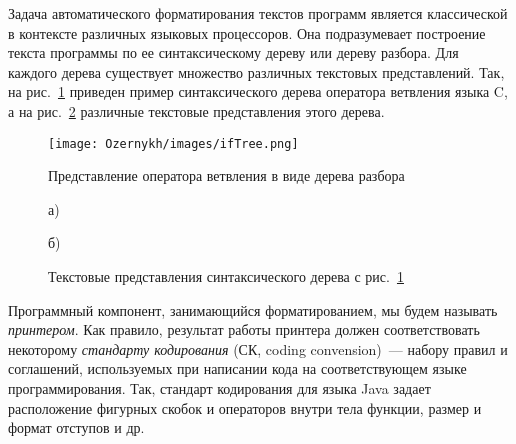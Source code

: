 Задача автоматического форматирования текстов программ является классической в контексте различных языковых процессоров.
Она подразумевает построение текста программы по ее синтаксическому дереву или дереву разбора.
Для каждого дерева существует множество различных текстовых представлений.
Так, на рис.~\ref{fig:ifTree} приведен пример синтаксического дерева оператора ветвления языка C, а на рис.~\ref{intro:treeToCode} различные текстовые представления этого дерева.
\begin{figure}[h]
	\centering
	\texttt{[image: Ozernykh/images/ifTree.png]}
	\caption{Представление оператора ветвления в виде дерева разбора}
	\label{fig:ifTree}
\end{figure}
\noindent
{}
\begin{figure}[ht]
  \noindent
  \begin{minipage}{.4\textwidth}
    
    \caption*{а) }    
  \end{minipage}
  \hfill
  \begin{minipage}{.5\textwidth}
    
    \caption*{б)}    
  \end{minipage}
  \caption{Текстовые представления синтаксического дерева с рис.~\ref{fig:ifTree}}
  \label{intro:treeToCode}
\end{figure}
\noindent
Программный компонент, занимающийся форматированием, мы будем называть \emph{принтером}.
Как правило, результат работы принтера должен соответствовать некоторому \emph{стандарту кодирования} (СК, coding convension)~--- набору правил и соглашений, используемых при написании кода на соответствующем языке программирования.
Так, стандарт кодирования для языка Java задает расположение фигурных скобок и операторов внутри тела функции, размер и формат отступов и др.

